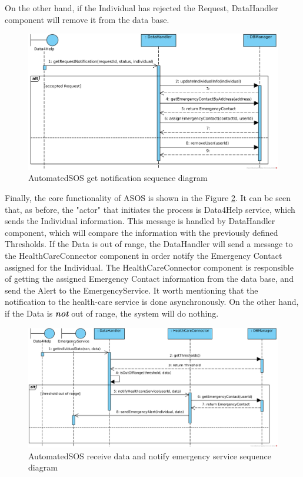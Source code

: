 \documentclass[a4paper, hidelinks, 12pt]{report}
\begin{document}
	On the other hand, if the Individual has rejected the Request, DataHandler component will remove it from the data base.
	\begin{figure}[H]
		\centering
		\includegraphics[width=1\textwidth]{diagrams/sequence_diagrams/asos_get_individual_notification.png}
		\caption[AutomatedSOS get notification sequence diagram]{AutomatedSOS get notification sequence diagram}
		\label{fig:asos_seq_get_notification}
	\end{figure}
	Finally, the core functionality of ASOS is shown in the Figure \ref{fig:asos_seq_receive_data}. It can be seen that, as before, the "actor" that initiates the process is Data4Help service, which sends the Individual information. This message is handled by DataHandler component, which will compare the information with the previously defined Thresholds. If the Data is out of range, the DataHandler will send a message to the HealthCareConnector component in order notify the Emergency Contact assigned for the Individual. The HealthCareConnector component is responsible of getting the assigned Emergency Contact information from the data base, and send the Alert to the EmergencyService. It worth mentioning that the notification to the health-care service is done asynchronously. On the other hand, if the Data is \textit{\textbf{not}} out of range, the system will do nothing.
	
	\begin{figure}[H]
		\centering
		\includegraphics[width=1\textwidth]{diagrams/sequence_diagrams/asos_receive_individual_data_and_notify_emergency_service.png}
		\caption[AutomatedSOS receive data and notify emergency service sequence diagram]{AutomatedSOS receive data and notify emergency service sequence diagram}
		\label{fig:asos_seq_receive_data}
	\end{figure}
	
\end{document}

